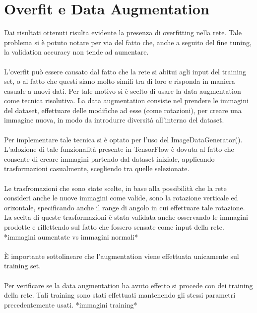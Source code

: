 \section{Overfit e Data Augmentation}
Dai risultati ottenuti risulta evidente la presenza di overfitting nella rete.
Tale problema si è potuto notare per via del fatto che, anche a seguito del fine tuning, la validation accuracy non tende 
ad aumentare.
\\\\
L'overfit può essere causato dal fatto che la rete si abitui agli input del training set, o al 
fatto che questi siano molto simili tra di loro e risponda in maniera casuale a nuovi dati. Per tale motivo si è scelto di usare la data augmentation come tecnica risolutiva.
La data augmentation consiste nel prendere le immagini del dataset, effettuare delle modifiche ad esse (come rotazioni), per 
creare una immagine nuova, in modo da introdurre diversità all'interno del dataset. 
\\\\
Per implementare tale tecnica si è optato per l'uso del ImageDataGenerator(). L'adozione di tale funzionalità presente in 
TensorFlow è dovuta al fatto che consente di creare immagini partendo dal dataset iniziale, applicando trasformazioni casualmente, scegliendo tra 
quelle selezionate.
\\\\
Le trasfromazioni che sono state scelte, in base alla possibilità che la rete consideri anche le nuove immagini come 
valide, sono la rotazione verticale ed orizontale, specificando anche il range di angolo in cui effettuare tale rotazione.
La scelta di queste trasformazioni è stata validata anche osservando le immagini prodotte e riflettendo sul fatto che fossero 
sensate come input della rete.
*immagini aumentate vs immagini normali*
\\\\
È importante sottolineare che l'augmentation viene effettuata unicamente sul training set.
\\\\
Per verificare se la data augmentation ha avuto effetto si procede con dei training della rete.
Tali training sono stati effettuati mantenendo gli stessi parametri precedentemente usati.
*immagini training*
